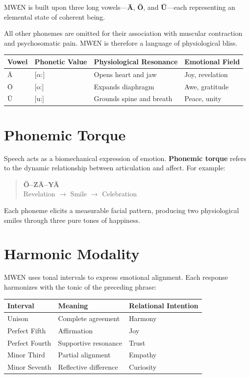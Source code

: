 \documentclass[11pt,a4paper]{article}
\begin{document}
MWƐN is built upon three long vowels—\textbf{Ā}, \textbf{Ō}, and \textbf{Ū}—each representing an elemental state of coherent being.

All other phonemes are omitted for their association with muscular contraction and psychosomatic pain. MWƐN is therefore a language of physiological bliss.

\begin{center}
\begin{tabularx}{\textwidth}{llll}
\toprule
\textbf{Vowel} & \textbf{Phonetic Value} & \textbf{Physiological Resonance} & \textbf{Emotional Field} \\
\midrule
Ā & {[$\alpha\text{:}]$} & Opens heart and jaw & Joy, revelation \\
Ō & {[$\text{o}\text{:}]$} & Expands diaphragm & Awe, gratitude \\
Ū & {[$\text{u}\text{:}]$} & Grounds spine and breath & Peace, unity \\
\bottomrule
\end{tabularx}
\end{center}

\section{Phonemic Torque}

Speech acts as a biomechanical expression of emotion.
\textbf{Phonemic torque} refers to the dynamic relationship between articulation and affect.
For example:
\begin{quote}
\textbf{Ō--ZĀ--YĀ} \\
Revelation $\rightarrow$ Smile $\rightarrow$ Celebration
\end{quote}
Each phoneme elicits a measurable facial pattern, producing two physiological smiles through three pure tones of happiness.

\section{Harmonic Modality}

MWƐN uses tonal intervals to express emotional alignment.
Each response harmonizes with the tonic of the preceding phrase:

\begin{center}
\begin{tabularx}{\textwidth}{lll}
\toprule
\textbf{Interval} & \textbf{Meaning} & \textbf{Relational Intention} \\
\midrule
Unison & Complete agreement & Harmony \\
Perfect Fifth & Affirmation & Joy \\
Perfect Fourth & Supportive resonance & Trust \\
Minor Third & Partial alignment & Empathy \\
Minor Seventh & Reflective difference & Curiosity \\
\bottomrule
\end{tabularx}
\end{center}
\end{document}
